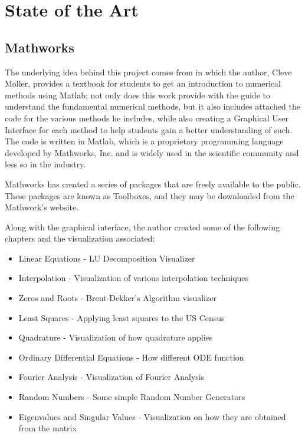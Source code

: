\chapter{State of the Art}
\section{Mathworks}
The underlying idea behind this project comes from \cite{doi:10.1137/1.9780898717952} in which the author, Cleve Moller, provides a textbook for students to get an introduction to numerical methods using Matlab; not only does this work provide with the guide to understand the fundamental numerical methods, but it also includes attached the code for the various methods he includes, while also creating a Graphical User Interface for each method to help students gain a better understanding of such. The code is written in Matlab, which is a proprietary programming language developed by Mathworks, Inc. and is widely used in the scientific community and less so in the industry.

Mathworks has created a series of packages that are freely available to the public. These packages are known as Toolboxes, and they may be downloaded from the Mathwork's website. 

Along with the graphical interface, the author created some of the following chapters and the visualization associated:
\begin{itemize}
    \item Linear Equations - LU Decomposition Visualizer
    \item Interpolation - Visualization of various interpolation techniques
    \item Zeros and Roots - Brent-Dekker's Algorithm visualizer
    \item Least Squares - Applying least squares to the US Census 
    \item Quadrature - Visualization of how quadrature applies
    \item Ordinary Differential Equations - How different ODE function
    \item Fourier Analysis - Visualization of Fourier Analysis
    \item Random Numbers - Some simple Random Number Generators
    \item Eigenvalues and Singular Values - Visualization on how they are obtained from the matrix
\end{itemize}



